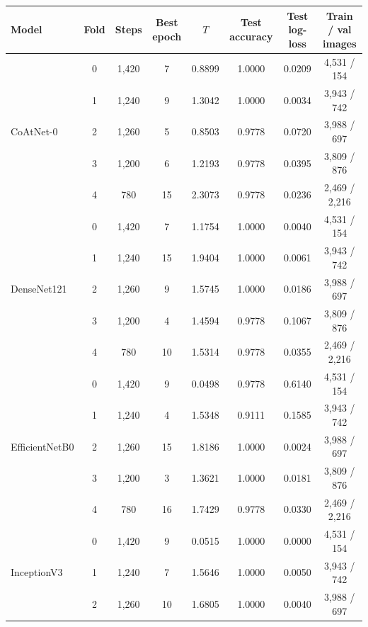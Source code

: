 \documentclass[a4paper,fleqn]{cas-sc}
\begin{document}
\begin{heretable}
\centering
\caption{Subtype classification: every full-image run. Optimiser steps depend on the fold because the group-aware folds differ in size, but within a fold they are equal for every model. In fold 0, whose validation fold has 154 images, the temperature of EfficientNetB0, InceptionV3 and Swin-Base lies at or near the lower search bound.}
\label{tab:runs-multiclass}
\scriptsize
\begin{tabular*}{\textwidth}{@{\extracolsep{\fill}}lccccccc@{}}
\toprule
Model & Fold & Steps & Best epoch & $T$ & Test accuracy & Test log-loss & Train / val images \\
\midrule
\multirow{5}{*}{CoAtNet-0} & 0 & 1,420 & 7 & 0.8899 & 1.0000 & 0.0209 & 4,531 / 154 \\
 & 1 & 1,240 & 9 & 1.3042 & 1.0000 & 0.0034 & 3,943 / 742 \\
 & 2 & 1,260 & 5 & 0.8503 & 0.9778 & 0.0720 & 3,988 / 697 \\
 & 3 & 1,200 & 6 & 1.2193 & 0.9778 & 0.0395 & 3,809 / 876 \\
 & 4 & 780 & 15 & 2.3073 & 0.9778 & 0.0236 & 2,469 / 2,216 \\
\midrule
\multirow{5}{*}{DenseNet121} & 0 & 1,420 & 7 & 1.1754 & 1.0000 & 0.0040 & 4,531 / 154 \\
 & 1 & 1,240 & 15 & 1.9404 & 1.0000 & 0.0061 & 3,943 / 742 \\
 & 2 & 1,260 & 9 & 1.5745 & 1.0000 & 0.0186 & 3,988 / 697 \\
 & 3 & 1,200 & 4 & 1.4594 & 0.9778 & 0.1067 & 3,809 / 876 \\
 & 4 & 780 & 10 & 1.5314 & 0.9778 & 0.0355 & 2,469 / 2,216 \\
\midrule
\multirow{5}{*}{EfficientNetB0} & 0 & 1,420 & 9 & 0.0498 & 0.9778 & 0.6140 & 4,531 / 154 \\
 & 1 & 1,240 & 4 & 1.5348 & 0.9111 & 0.1585 & 3,943 / 742 \\
 & 2 & 1,260 & 15 & 1.8186 & 1.0000 & 0.0024 & 3,988 / 697 \\
 & 3 & 1,200 & 3 & 1.3621 & 1.0000 & 0.0181 & 3,809 / 876 \\
 & 4 & 780 & 16 & 1.7429 & 0.9778 & 0.0330 & 2,469 / 2,216 \\
\midrule
\multirow{5}{*}{InceptionV3} & 0 & 1,420 & 9 & 0.0515 & 1.0000 & 0.0000 & 4,531 / 154 \\
 & 1 & 1,240 & 7 & 1.5646 & 1.0000 & 0.0050 & 3,943 / 742 \\
 & 2 & 1,260 & 10 & 1.6805 & 1.0000 & 0.0040 & 3,988 / 697 \\

\end{tabular*}
\end{heretable}
\end{document}
